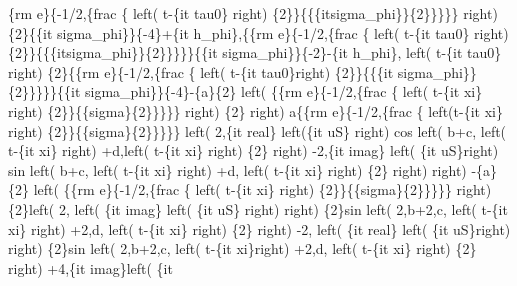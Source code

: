 \begin{maplegroup}
\{rm e\}\{-1/2,\{frac \{ left( t-\{it tau0\} right) \{2\}\}\{\{\{itsigma\_phi\}\}\{2\}\}\}\}\} right) \{2\}\{\{it sigma\_phi\}\}\{-4\}+\{it h\_phi\},\{\{rm e\}\{-1/2,\{frac \{ left( t-\{it tau0\} right) \{2\}\}\{\{\{itsigma\_phi\}\}\{2\}\}\}\}\}\{\{it sigma\_phi\}\}\{-2\}-\{it h\_phi\}, left( t-\{it tau0\} right) \{2\}\{\{rm e\}\{-1/2,\{frac \{ left( t-\{it tau0\}right) \{2\}\}\{\{\{it sigma\_phi\}\}\{2\}\}\}\}\}\{\{it sigma\_phi\}\}\{-4\}-\{a\}\{2\} left( \{\{rm e\}\{-1/2,\{frac \{ left( t-\{it xi\} right) \{2\}\}\{\{sigma\}\{2\}\}\}\}\} right) \{2\} right) a\{\{rm e\}\{-1/2,\{frac \{ left(t-\{it xi\} right) \{2\}\}\{\{sigma\}\{2\}\}\}\}\} left( 2,\{it real\} left(\{it uS\} right) cos left( b+c, left( t-\{it xi\} right) +d,left( t-\{it xi\} right) \{2\} right) -2,\{it imag\} left( \{it uS\}right) sin left( b+c, left( t-\{it xi\} right) +d, left( t-\{it xi\} right) \{2\} right)  right) -\{a\}\{2\} left( \{\{rm e\}\{-1/2,\{frac \{ left( t-\{it xi\} right) \{2\}\}\{\{sigma\}\{2\}\}\}\}\} right) \{2\}left( 2, left( \{it imag\} left( \{it uS\} right)  right) \{2\}sin left( 2,b+2,c, left( t-\{it xi\} right) +2,d, left( t-\{it xi\} right) \{2\} right) -2, left( \{it real\} left( \{it uS\}right)  right) \{2\}sin left( 2,b+2,c, left( t-\{it xi\}right) +2,d, left( t-\{it xi\} right) \{2\} right) +4,\{it imag\}left( \{it 
\end{maplegroup}
